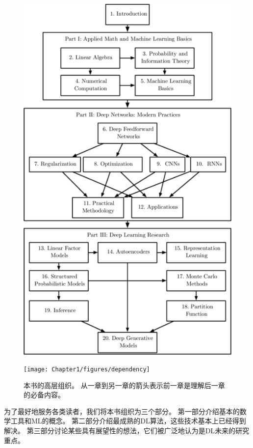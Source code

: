 \begin{figure}[!htb]
\ifOpenSource
\centerline{\includegraphics[scale=0.5]{images/6.png}}
\else
\centerline{\texttt{[image: Chapter1/figures/dependency]}}
\fi
\caption{本书的高层组织。
从一章到另一章的箭头表示前一章是理解后一章的必备内容。}
\label{fig:chap1_dependency}
\end{figure}


为了最好地服务各类读者，我们将本书组织为三个部分。
第一部分介绍基本的数学工具和\gls{ML}的概念。
第二部分介绍最成熟的\gls{DL}算法，这些技术基本上已经得到解决。
第三部分讨论某些具有展望性的想法，它们被广泛地认为是\gls{DL}未来的研究重点。

